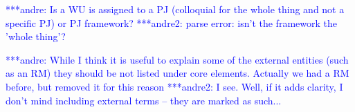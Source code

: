 \documentclass[conference,final]{IEEEtran}
\newcommand{\alnote}[1]{ {\textcolor{blue} { ***andre: #1 }}}
\newcommand{\amnote}[1]{ {\textcolor{blue} { ***andre2: #1 }}}
\newcommand{\alnote}[1]{}
\newcommand{\amnote}[1]{}
\begin{document}




\alnote{Is a WU is assigned to a PJ (colloquial for the whole thing
  and not a specific PJ) or PJ framework?}
\amnote{parse error: isn't the framework the 'whole thing'?}

\alnote{While I think it is useful to explain some of the external
  entities (such as an RM) they should be not listed under core
  elements. Actually we had a RM before, but removed it for this
  reason} \amnote{I see.  Well, if it adds clarity, I don't mind
  including external terms -- they are marked as such...}
\end{document}
